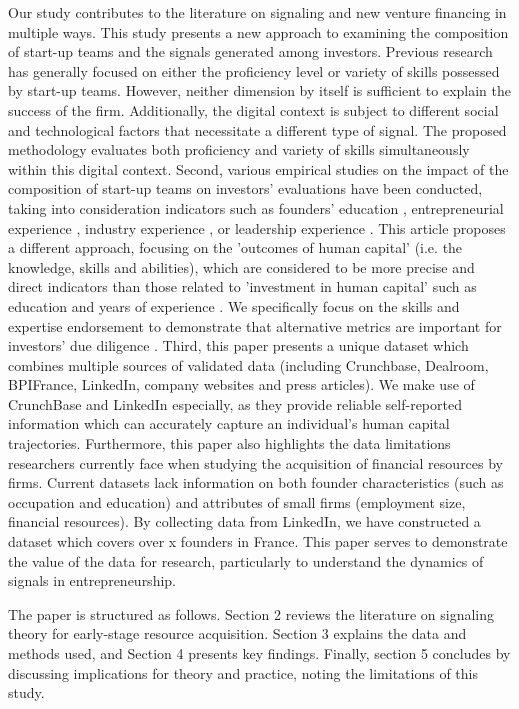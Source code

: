 \documentclass[12pt]{article}
\begin{document}
Our study contributes to the literature on signaling and new venture financing in multiple ways. This study presents a new approach to examining the composition of start-up teams and the signals generated among investors. Previous research has generally focused on either the proficiency level or variety of skills possessed by start-up teams. However, neither dimension by itself is sufficient to explain the success of the firm. Additionally, the digital context is subject to different social and technological factors that necessitate a different type of signal. The proposed methodology evaluates both proficiency and variety of skills simultaneously within this digital context. Second, various empirical studies on the impact of the composition of start-up teams on investors' evaluations have been conducted, taking into consideration indicators such as founders' education \citep{franke2008venture}, entrepreneurial experience \citep{beckman2007early}, industry experience \citep{becker2015new}, or leadership experience \citep{hoenig2015quality}. This article proposes a different approach, focusing on the 'outcomes of human capital' (i.e. the knowledge, skills and abilities), which are considered to be more precise and direct indicators than those related to 'investment in human capital' such as education and years of experience \citep{unger2011human, marvel2016human}. We specifically focus on the skills and expertise endorsement to demonstrate that alternative metrics are important for investors' due diligence \citep{colombo2021use}. Third, this paper presents a unique dataset which combines multiple sources of validated data (including Crunchbase, Dealroom, BPIFrance, LinkedIn, company websites and press articles). We make use of CrunchBase and LinkedIn especially, as they provide reliable self-reported information which can accurately capture an individual's human capital trajectories. Furthermore, this paper also highlights the data limitations researchers currently face when studying the acquisition of financial resources by firms. Current datasets lack information on both founder characteristics (such as occupation and education) and attributes of small firms (employment size, financial resources). By collecting data from LinkedIn, we have constructed a dataset which covers over x founders in France. This paper serves to demonstrate the value of the data for research, particularly to understand the dynamics of signals in entrepreneurship.

The paper is structured as follows. Section 2 reviews the literature on signaling theory for early-stage resource acquisition. Section 3 explains the data and methods used, and Section 4 presents key findings. Finally, section 5 concludes by discussing implications for theory and practice, noting the limitations of this study.
\end{document}

